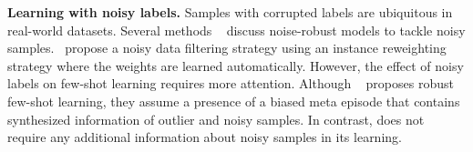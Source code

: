 \textbf{Learning with noisy labels.} Samples with corrupted labels are ubiquitous in real-world datasets. Several methods ~\citep{luo2015foveation, jalal2017robust, wang2019direct} discuss noise-robust models to tackle noisy samples.~\citet{ren2018learning, shu2019meta} propose a noisy data filtering strategy using an instance reweighting strategy where the weights are learned automatically. However, the effect of noisy labels on few-shot learning requires more attention. Although ~\cite{lu2020robust} proposes robust few-shot learning, they assume a presence of a biased meta episode that contains synthesized information of outlier and noisy samples. In contrast, \sysname{} does not require any additional information about noisy samples in its learning.%


